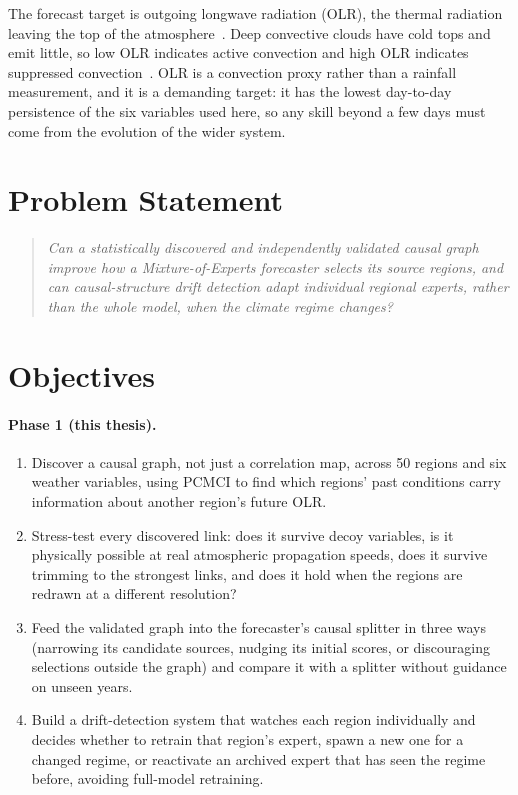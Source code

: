 The forecast target is outgoing longwave radiation (OLR), the thermal radiation leaving the top of the atmosphere~\cite{liebmann1996description}. Deep convective clouds have cold tops and emit little, so low OLR indicates active convection and high OLR indicates suppressed convection~\cite{arkin1987relationship}. OLR is a convection proxy rather than a rainfall measurement, and it is a demanding target: it has the lowest day-to-day persistence of the six variables used here, so any skill beyond a few days must come from the evolution of the wider system.

\section{Problem Statement}
\label{sec:intro-problem}

\begin{quote}
\emph{Can a statistically discovered and independently validated causal graph improve how a Mixture-of-Experts forecaster selects its source regions, and can causal-structure drift detection adapt individual regional experts, rather than the whole model, when the climate regime changes?}
\end{quote}

\section{Objectives}
\label{sec:intro-objectives}

\paragraph{Phase 1 (this thesis).}
\begin{enumerate}[label=\textbf{O\arabic*.}]
  \item Discover a causal graph, not just a correlation map, across 50 regions and six weather variables, using PCMCI to find which regions' past conditions carry information about another region's future OLR.
  \item Stress-test every discovered link: does it survive decoy variables, is it physically possible at real atmospheric propagation speeds, does it survive trimming to the strongest links, and does it hold when the regions are redrawn at a different resolution?
  \item Feed the validated graph into the forecaster's causal splitter in three ways (narrowing its candidate sources, nudging its initial scores, or discouraging selections outside the graph) and compare it with a splitter without guidance on unseen years.
  \item Build a drift-detection system that watches each region individually and decides whether to retrain that region's expert, spawn a new one for a changed regime, or reactivate an archived expert that has seen the regime before, avoiding full-model retraining.
\end{enumerate}


